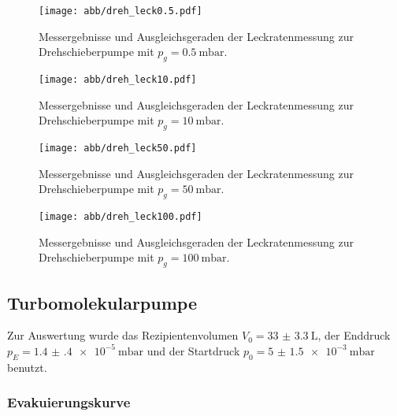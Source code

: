     \begin{figure}
        \centering
        \texttt{[image: abb/dreh\_leck0.5.pdf]}
        \caption{Messergebnisse und Ausgleichsgeraden der Leckratenmessung zur Drehschieberpumpe mit $p_g = \qty{0.5}{\milli\bar}$.}
        \label{fig:drehLeck05}
    \end{figure}

    \begin{figure}
        \centering
        \texttt{[image: abb/dreh\_leck10.pdf]}
        \caption{Messergebnisse und Ausgleichsgeraden der Leckratenmessung zur Drehschieberpumpe mit $p_g = \qty{10}{\milli\bar}$.}
        \label{fig:drehLeck10}
    \end{figure}

    \begin{figure}
        \centering
        \texttt{[image: abb/dreh\_leck50.pdf]}
        \caption{Messergebnisse und Ausgleichsgeraden der Leckratenmessung zur Drehschieberpumpe mit $p_g = \qty{50}{\milli\bar}$.}
        \label{fig:drehLeck50}
    \end{figure}

    \begin{figure}
        \centering
        \texttt{[image: abb/dreh\_leck100.pdf]}
        \caption{Messergebnisse und Ausgleichsgeraden der Leckratenmessung zur Drehschieberpumpe mit $p_g = \qty{100}{\milli\bar}$.}
        \label{fig:drehLeck100}
    \end{figure}
    
\newpage
\subsection{Turbomolekularpumpe}
    Zur Auswertung wurde das Rezipientenvolumen $V_0 = \SI{33(3.3)}{\liter}$\cite{sample}, der Enddruck $p_E = \qty{1.4(4)e-5}{\milli\bar}$
    und der Startdruck $p_0 = \qty{5(1.5)e-3}{\milli\bar}$ benutzt.

    \subsubsection{Evakuierungskurve}

